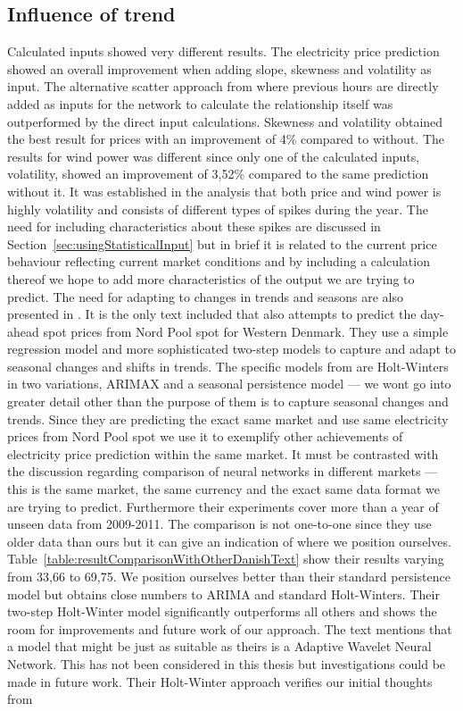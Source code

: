 \subsection{Influence of trend}
\label{sec:influenceOfTrendInCalcInput}
Calculated inputs showed very different results. The electricity price prediction showed an overall improvement when adding slope, skewness and volatility as input. The alternative scatter approach from \cite{singhal2011electricity} where previous hours are directly added as inputs for the network to calculate the relationship itself was outperformed by the direct input calculations. Skewness and volatility obtained the best result for prices with an improvement of 4\% compared to without. The results for wind power was different since only one of the calculated inputs, volatility, showed an improvement of 3,52\% compared to the same prediction without it. It was established in the analysis that both price and wind power is highly volatility and consists of different types of spikes during the year. The need for including characteristics about these spikes are discussed in Section~\ref{sec:usingStatisticalInput} but in brief it is related to the current price behaviour reflecting current market conditions and by including a calculation thereof we hope to add more characteristics of the output we are trying to predict. The need for adapting to changes in trends and seasons are also presented in \cite{forecastingSpotPricesAccountingForWindPower}. It is the only text included that also attempts to predict the day-ahead spot prices from Nord Pool spot for Western Denmark. They use a simple regression model and more sophisticated two-step models to capture and adapt to seasonal changes and shifts in trends. The specific models from \cite{forecastingSpotPricesAccountingForWindPower} are Holt-Winters in two variations, ARIMAX and a seasonal persistence model --- we wont go into greater detail other than the purpose of them is to capture seasonal changes and trends. Since they are predicting the exact same market and use same electricity prices from Nord Pool spot we use it to exemplify other achievements of electricity price prediction within the same market. It must be contrasted with the discussion regarding comparison of neural networks in different markets --- this is the same market, the same currency and the exact same data format we are trying to predict. Furthermore their experiments cover more than a year of unseen data from 2009-2011. The comparison is not one-to-one since they use older data than ours but it can give an indication of where we position ourselves. Table~\ref{table:resultComparisonWithOtherDanishText} show their results varying from 33,66 to 69,75. We position ourselves better than their standard persistence model but obtains close numbers to ARIMA and standard Holt-Winters. Their two-step Holt-Winter model significantly outperforms all others and shows the room for improvements and future work of our approach. The text mentions that a model that might be just as suitable as theirs is a Adaptive Wavelet Neural Network. This has not been considered in this thesis but investigations could be made in future work. Their Holt-Winter approach verifies our initial thoughts from 